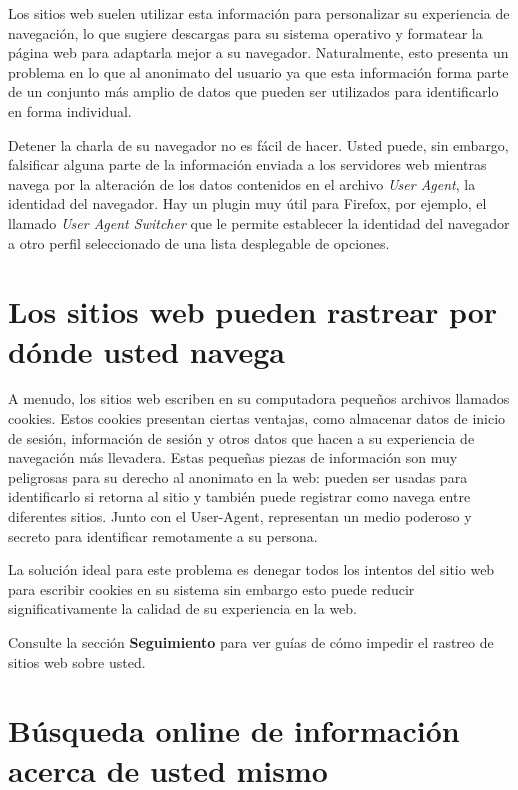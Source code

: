 \documentclass[10pt,a5paper,twoside,,]{book}
\begin{document}
Los sitios web suelen utilizar esta información para personalizar su
experiencia de navegación, lo que sugiere descargas para su sistema
operativo y formatear la página web para adaptarla mejor a su navegador.
Naturalmente, esto presenta un problema en lo que al anonimato del
usuario ya que esta información forma parte de un conjunto más amplio de
datos que pueden ser utilizados para identificarlo en forma individual.

Detener la charla de su navegador no es fácil de hacer. Usted puede, sin
embargo, falsificar alguna parte de la información enviada a los
servidores web mientras navega por la alteración de los datos contenidos
en el archivo \emph{User Agent}, la identidad del navegador. Hay un
plugin muy útil para Firefox, por ejemplo, el llamado \emph{User Agent
Switcher} que le permite establecer la identidad del navegador a otro
perfil seleccionado de una lista desplegable de opciones.

\section{Los sitios web pueden rastrear por dónde usted
navega}\label{los-sitios-web-pueden-rastrear-por-duxf3nde-usted-navega}

A menudo, los sitios web escriben en su computadora pequeños archivos
llamados cookies. Estos cookies presentan ciertas ventajas, como
almacenar datos de inicio de sesión, información de sesión y otros datos
que hacen a su experiencia de navegación más llevadera. Estas pequeñas
piezas de información son muy peligrosas para su derecho al anonimato en
la web: pueden ser usadas para identificarlo si retorna al sitio y
también puede registrar como navega entre diferentes sitios. Junto con
el User-Agent, representan un medio poderoso y secreto para identificar
remotamente a su persona.

La solución ideal para este problema es denegar todos los intentos del
sitio web para escribir cookies en su sistema sin embargo esto puede
reducir significativamente la calidad de su experiencia en la web.

Consulte la sección \textbf{Seguimiento} para ver guías de cómo impedir
el rastreo de sitios web sobre usted.

\section{Búsqueda online de información acerca de usted
mismo}\label{buxfasqueda-online-de-informaciuxf3n-acerca-de-usted-mismo}
\end{document}
